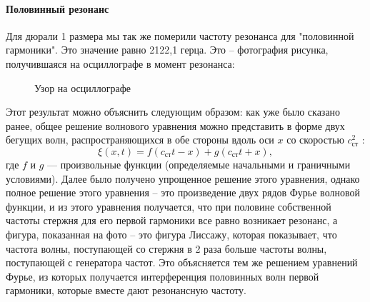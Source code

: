 \documentclass[a4paper, 12pt]{article}%
\begin{document}
\paragraph*{Половинный резонанс}
Для дюрали 1 размера мы так же померили частоту резонанса для "половинной гармоники". Это значение равно 2122,1 герца. Это -- фотография рисунка, получившаяся на осциллографе в момент резонанса:
\begin{figure}[h!]
\caption{Узор на осциллографе}
\end{figure}
Этот результат можно объяснить следующим образом: как уже было сказано ранее,  общее решение волнового уравнения можно представить в форме двух бегущих волн, распространяющихся в обе стороны вдоль оси $x$ со скоростью
$c^2_{\text{ст}}$ : 
\[\xi(x,t)=f(c_{\text{ст}}t-x)+g(c_{\text{ст}}t+x),\]
где $f$ и $g$ — произвольные функции (определяемые начальными и граничными
условиями). Далее было получено упрощенное решение этого уравнения, однако полное решение этого уравнения -- это произведение двух рядов Фурье волновой функции, и из этого уравнения получается, что при половине собственной частоты стержня для его первой гармоники все равно возникает резонанс, а фигура, показанная на фото -- это фигура Лиссажу, которая показывает, что частота волны, поступающей со стержня в 2 раза больше частоты волны, поступающей с генератора частот. Это объясняется тем же решением уравнений Фурье, из которых получается интерференция половинных волн первой гармоники, которые вместе дают резонансную частоту.
\end{document}
